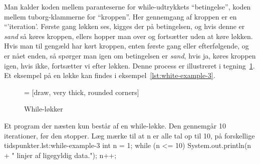         Man kalder koden mellem paranteserne for while-udtrykkets
        ``betingelse'', koden mellem tuborg-klammerne for ``kroppen''.
        Her gennemgang af kroppen er en ``'iteration'.  Første gang
        løkken ses, kigges der på betingelsen, og hvis denne er
        \emph{sand} så køres kroppen, ellers hopper man over og
        fortsætter uden at køre løkken. Hvis man til gengæld har kørt
        kroppen, enten første gang eller efterfølgende, og er nået
        enden, så spørger man igen om betingelsen er \emph{sand}, hvis
        ja, køres kroppen igen, hvis ikke, fortsætter vi efter løkken.
        Denne process er illustreret i
        tegning~\ref{fig:while-loop-illustrated}. Et eksempel på en
        løkke kan findes i eksempel~\ref{lst:white-example-3}.

        \begin{figure}
        \center
         = [draw, very thick, rounded corners]
        \caption{While-løkker}
        \label{fig:while-loop-illustrated}
        \end{figure}

		\begin{JavaCode}{Et program der næsten kun består af en while-løkke. Den gennemgår 10 iterationer, før den stopper. Læg mærke til at n er alle tal op til 10, på forskellige tidspunkter.}{lst:while-example-3}
			int n = 1;
			while (n <= 10) {
				System.out.println(n + " linjer af ligegyldig data.");
				n++;
			}
		\end{JavaCode}

